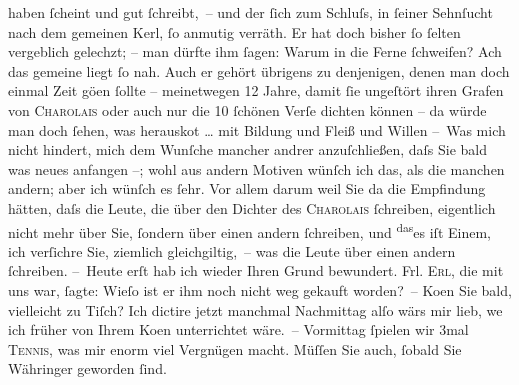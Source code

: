 \begin{ledgroupsized}[t]{13cm}
               haben ſcheint und gut ſchreibt, – und der ſich zum Schluſs, in ſeiner Sehnſucht {\pb}nach dem gemeinen Kerl, ſo anmutig verräth. Er hat
               doch bisher ſo ſelten vergeblich gelechzt; – man dürfte ihm ſagen: Warum in die Ferne
               ſchweifen? Ach das gemeine liegt ſo nah. Auch er gehört übrigens zu denjenigen, denen
               man doch einmal Zeit gö{\geminationn}en ſollte – meinetwegen 12
               Jahre, damit ſie ungeſtört ihren Grafen von \textsc{Charolais} oder auch nur die 10 ſchönen Verſe dichten können – da{\geminationn} würde man doch {\pb}ſehen,
               was herausko{\geminationm}t {\dots} mit Bildung
               und Fleiß und Willen {\dotsfour}\pend
           \pstart
           – Was mich nicht hindert, mich dem Wunſche mancher andrer anzuſchließen, daſs Sie
               bald was neues anfangen –; wohl aus andern Motiven wünſch ich das, als die manchen
               andern; aber ich wünſch es ſehr. Vor allem darum weil Sie da{\geminationn} die Empfindung hätten, daſs die Leute, die über den
               Dichter des \textsc{Charolais} ſchreiben, eigentlich nicht mehr über Sie, ſondern über {\pb}einen andern ſchreiben, und \substVorne{}\textsuperscript{das}\substDazwischen{}es\substHinten{} iſt Einem, ich
               verſichre Sie,  ziemlich gleichgiltig, – was die
               Leute über einen andern ſchreiben.\pend
           \pstart
           – Heute erſt hab ich wieder Ihren Grund bewundert. Frl. \textsc{Erl}, die mit uns war, ſagte: Wieſo ist er ihm noch nicht weg gekauft worden? –\pend
           \pstart
           Ko{\geminationm}en Sie bald, vielleicht zu Tiſch? Ich dictire jetzt
               manchmal Nachmittag alſo wärs mir lieb, we{\geminationn} ich früher
               von Ihrem Ko{\geminationm}en unterrichtet {\pb}wäre. – Vormittag ſpielen wir 3mal \textsc{Tennis}, was mir enorm viel Vergnügen macht. Müſſen Sie auch,
               ſobald Sie Währinger geworden ſind.\pend

\end{ledgroupsized}
